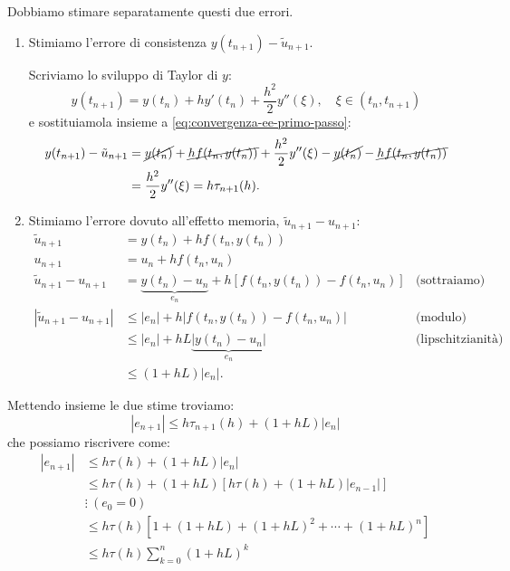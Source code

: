 Dobbiamo stimare separatamente questi due errori.
\begin{enumerate}
\item Stimiamo l'errore di consistenza $y( t_{n+1}) -\tilde{u}_{n+1}$.

Scriviamo lo sviluppo di Taylor di $y$:
\begin{equation*}
y( t_{n+1}) =y( t_{n}) +hy'( t_{n}) +\frac{h^{2}}{2} y''( \xi ) ,\quad \xi \in ( t_{n} ,t_{n+1})
\end{equation*}
e sostituiamola insieme a \eqref{eq:convergenza-ee-primo-passo}:
\begin{align*}
y( t_{n+1}) -\tilde{u}_{n+1} & =\cancel{y( t_{n})} +\cancel{hf( t_{n} ,y( t_{n}))} +\frac{h^{2}}{2} y''( \xi ) -\cancel{y( t_{n})} -\cancel{hf( t_{n} ,y( t_{n}))}\\
 & =\frac{h^{2}}{2} y''( \xi ) =h\tau _{n+1}(h).
\end{align*}
\item Stimiamo l'errore dovuto all'effetto memoria, $\tilde{u}_{n+1} -u_{n+1}$:
\begin{align*}
	\tilde{u}_{n+1}                        & =y( t_{n}) +hf( t_{n} ,y( t_{n}))                                                  &                           \\
	u_{n+1}                                & =u_{n} +hf( t_{n} ,u_{n})                                                          &                           \\
	\tilde{u}_{n+1} -u_{n+1}               & =\underbrace{y( t_{n}) -u_{n}}_{e_{n}} +h[ f( t_{n} ,y( t_{n})) -f( t_{n} ,u_{n})] & \text{(sottraiamo)}       \\
	\left| \tilde{u}_{n+1} -u_{n+1}\right| & \leqslant | e_{n}| +h| f( t_{n} ,y( t_{n})) -f( t_{n} ,u_{n})|                     & \text{(modulo)}           \\
	                                       & \leqslant | e_{n}| +hL\underbrace{| y( t_{n}) -u_{n}| }_{e_{n}}                    & \text{(lipschitzianità)} \\
	                                       & \leqslant ( 1+hL)| e_{n}|.                                                         &
\end{align*}
\end{enumerate}
Mettendo insieme le due stime troviamo:
\begin{equation*}
| e_{n+1}| \leqslant h\tau _{n+1}(h) +( 1+hL)| e_{n}|
\end{equation*}
che possiamo riscrivere come:
\begin{equation*}
\begin{aligned}
| e_{n+1}|  & \leqslant h\tau (h) +( 1+hL)| e_{n}| \\
 & \leqslant h\tau (h) +( 1+hL)[ h\tau (h) +( 1+hL)| e_{n-1}| ]\\
 & \vdots \ ( e_{0} =0)\\
 & \leqslant h\tau (h)\left[ 1+( 1+hL) +( 1+hL)^{2} +\cdots +( 1+hL)^{n}\right]\\
 & \leqslant h\tau (h)\sum\limits ^{n}_{k=0}( 1+hL)^{k}
\end{aligned}
\end{equation*}
